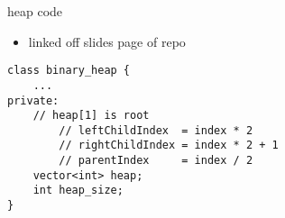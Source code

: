 \begin{frame}[fragile,label=heapCodeIntro]{heap code}
\lstset{language=C++,style=small}
\begin{itemize}
\item linked off slides page of repo
\end{itemize}
\begin{lstlisting}
class binary_heap {
    ...
private:
    // heap[1] is root
        // leftChildIndex  = index * 2
        // rightChildIndex = index * 2 + 1 
        // parentIndex     = index / 2
    vector<int> heap;
    int heap_size;
}
\end{lstlisting}
\end{frame}
